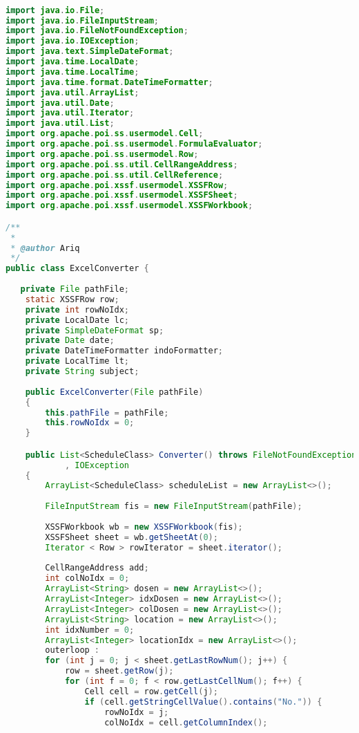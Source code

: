 \begin{lstlisting}[language=Java,basicstyle=\tiny,caption=ExcelConverter.java sebelum revisi,label=lst:ExcelConverterLama]

import java.io.File;
import java.io.FileInputStream;
import java.io.FileNotFoundException;
import java.io.IOException;
import java.text.SimpleDateFormat;
import java.time.LocalDate;
import java.time.LocalTime;
import java.time.format.DateTimeFormatter;
import java.util.ArrayList;
import java.util.Date;
import java.util.Iterator;
import java.util.List;
import org.apache.poi.ss.usermodel.Cell;
import org.apache.poi.ss.usermodel.FormulaEvaluator;
import org.apache.poi.ss.usermodel.Row;
import org.apache.poi.ss.util.CellRangeAddress;
import org.apache.poi.ss.util.CellReference;
import org.apache.poi.xssf.usermodel.XSSFRow;
import org.apache.poi.xssf.usermodel.XSSFSheet;
import org.apache.poi.xssf.usermodel.XSSFWorkbook;

/**
 *
 * @author Ariq
 */
public class ExcelConverter {
    
   private File pathFile;
    static XSSFRow row;
    private int rowNoIdx;
    private LocalDate lc;
    private SimpleDateFormat sp;
    private Date date;
    private DateTimeFormatter indoFormatter;
    private LocalTime lt;
    private String subject;
    
    public ExcelConverter(File pathFile)
    {
        this.pathFile = pathFile;
        this.rowNoIdx = 0;
    }

    public List<ScheduleClass> Converter() throws FileNotFoundException
            , IOException
    {
        ArrayList<ScheduleClass> scheduleList = new ArrayList<>();
        
        FileInputStream fis = new FileInputStream(pathFile);
        
        XSSFWorkbook wb = new XSSFWorkbook(fis);
        XSSFSheet sheet = wb.getSheetAt(0);
        Iterator < Row > rowIterator = sheet.iterator();   
     
        CellRangeAddress add;
        int colNoIdx = 0;
        ArrayList<String> dosen = new ArrayList<>();
        ArrayList<Integer> idxDosen = new ArrayList<>();
        ArrayList<Integer> colDosen = new ArrayList<>();
        ArrayList<String> location = new ArrayList<>();
        int idxNumber = 0;
        ArrayList<Integer> locationIdx = new ArrayList<>();
        outerloop :
        for (int j = 0; j < sheet.getLastRowNum(); j++) {
            row = sheet.getRow(j);
            for (int f = 0; f < row.getLastCellNum(); f++) {
                Cell cell = row.getCell(j);
                if (cell.getStringCellValue().contains("No.")) {
                    rowNoIdx = j;
                    colNoIdx = cell.getColumnIndex();
                   

\end{lstlisting}
